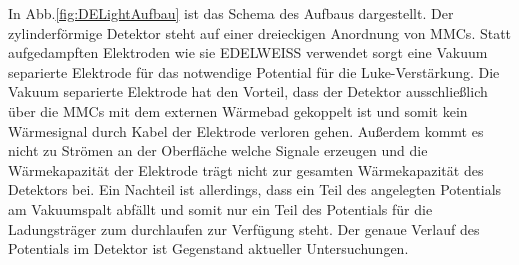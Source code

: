 In Abb.\ref{fig:DELightAufbau} ist das Schema des Aufbaus dargestellt.
Der zylinderförmige Detektor steht auf einer dreieckigen Anordnung von MMCs.
Statt aufgedampften Elektroden wie sie EDELWEISS verwendet sorgt eine Vakuum separierte Elektrode für das notwendige Potential für die Luke-Verstärkung.
Die Vakuum separierte Elektrode hat den Vorteil, dass der Detektor ausschließlich über die MMCs mit dem externen Wärmebad gekoppelt ist und somit kein Wärmesignal durch Kabel der Elektrode verloren gehen.
Außerdem kommt es nicht zu Strömen an der Oberfläche welche Signale erzeugen und die Wärmekapazität der Elektrode trägt nicht zur gesamten Wärmekapazität des Detektors bei.
Ein Nachteil ist allerdings, dass ein Teil des angelegten Potentials am Vakuumspalt abfällt und somit nur ein Teil des Potentials für die Ladungsträger zum durchlaufen zur Verfügung steht.
Der genaue Verlauf des Potentials im Detektor ist Gegenstand aktueller Untersuchungen.



